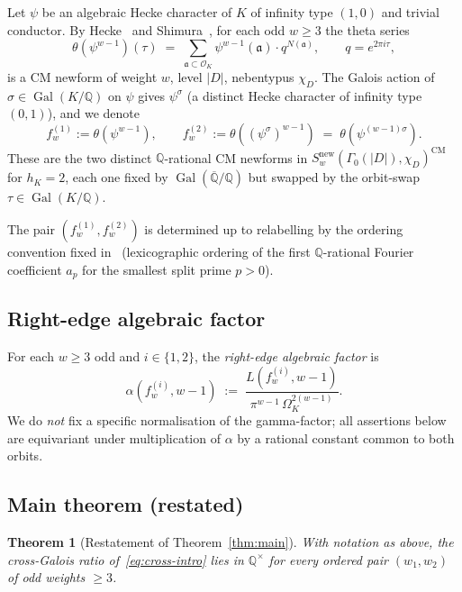 \documentclass[11pt,a4paper]{amsart}
\theoremstyle{plain}
\newtheorem{theorem}{Theorem}[section]
\theoremstyle{definition}
\DeclareMathOperator{\Gal}{Gal}
\newcommand{\Q}{\mathbb{Q}}
\newcommand{\OK}{\mathcal{O}_K}
\newcommand{\Qbar}{\overline{\Q}}
\newcommand{\absD}{\lvert D\rvert}
\newcommand{\eqdef}{:=}
\newcommand{\fl}[2]{f_{#1}^{(#2)}}
\begin{document}
Let $\psi$ be an algebraic Hecke character of $K$ of infinity type
$(1, 0)$ and trivial conductor.  By Hecke~\cite{Hecke1936} and
Shimura~\cite[\S 3.4, \S 7.6]{Shimura1971}, for each odd $w \ge 3$ the
theta series
\[
   \theta(\psi^{w-1})(\tau) \;=\; \sum_{\mathfrak{a} \subset \OK}
     \psi^{w-1}(\mathfrak{a}) \cdot q^{N(\mathfrak{a})},
   \qquad q = e^{2\pi i \tau},
\]
is a CM newform of weight $w$, level $\absD$, nebentypus $\chi_D$.
The Galois action of $\sigma \in \Gal(K/\Q)$ on $\psi$ gives
$\psi^\sigma$ (a distinct Hecke character of infinity type $(0,1)$),
and we denote
\[
   \fl{w}{1} \eqdef \theta(\psi^{w-1}),
   \qquad
   \fl{w}{2} \eqdef \theta((\psi^\sigma)^{w-1})
   \;=\; \theta(\psi^{(w-1)\sigma}).
\]
These are the two distinct $\Q$-rational CM newforms in
$S_w^{\mathrm{new}}(\Gamma_0(\absD), \chi_D)^{\mathrm{CM}}$ for $h_K = 2$,
each one fixed by $\Gal(\Qbar/\Q)$ but swapped by the orbit-swap
$\tau \in \Gal(K/\Q)$.

The pair $(\fl{w}{1}, \fl{w}{2})$ is determined up to relabelling by
the ordering convention fixed in~\cite[\S2.2]{Remondiere2026P6}
(lexicographic ordering of the first $\Q$-rational
Fourier coefficient $a_p$ for the smallest split prime $p > 0$).

\subsection{Right-edge algebraic factor}\label{ss:setup-edge}

For each $w \ge 3$ odd and $i \in \{1, 2\}$, the
\emph{right-edge algebraic factor} is
\begin{equation}\label{eq:alpha-def}
   \alpha(\fl{w}{i}, w-1)
   \;\eqdef\;
   \frac{L(\fl{w}{i}, w-1)}{\pi^{w-1}\,\Omega_K^{2(w-1)}}.
\end{equation}
We do \emph{not} fix a specific normalisation of the gamma-factor;
all assertions below are equivariant under multiplication of
$\alpha$ by a rational constant common to both orbits.

\subsection{Main theorem (restated)}\label{ss:main-restated}

\begin{theorem}[Restatement of Theorem~\ref{thm:main}]\label{thm:main-restated}
With notation as above, the cross-Galois ratio of~\eqref{eq:cross-intro}
lies in $\Q^\times$ for every ordered pair $(w_1, w_2)$ of odd weights
$\ge 3$.
\end{theorem}
\end{document}

